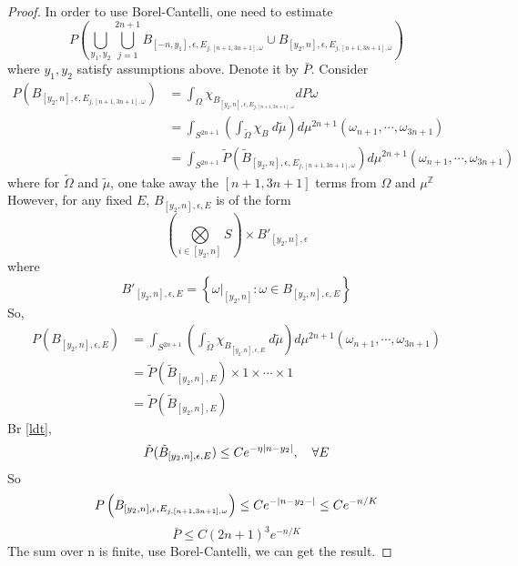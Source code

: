 \begin{proof}
In order to use Borel-Cantelli, one need to estimate
\[
  P\left(\bigcup\limits_{y_1,y_2}\bigcup\limits_{j=1}^{2n+1}
  B_{[-n,y_1],\epsilon,E_{j,[n+1,3n+1],\omega}}\cup B_{[y_2,n],\epsilon,E_{j,[n+1,3n+1],\omega}}\right)
\]
where $y_1,y_2$ satisfy assumptions above. Denote it by $\bar{P}$. Consider
\[
  \begin{aligned}
    P\left(B_{[y_2,n],\epsilon,E_{j,[n+1,3n+1],\omega}}\right)
    &= \int_\Omega \chi_{B_{[y_2,n],\epsilon,E_{j,[n+1,3n+1],\omega}}} dP\omega\\
    &= \int_{S^{2n+1}}\left(\int_{\tilde{\Omega}} \chi_{B}~ d\tilde{\mu}\right)d\mu^{2n+1}(\omega_{n+1},\cdots,\omega_{3n+1})\\
    &=\int_{S^{2n+1}} \tilde{P}(\tilde{B}_{[y_2,n],\epsilon,E_{j,[n+1,3n+1],\omega}})d\mu^{2n+1}(\omega_{n+1},\cdots,\omega_{3n+1})
  \end{aligned}
\]
where for $\tilde{\Omega}$ and $\tilde{\mu}$, one take away the $[n+1,3n+1]$ terms from $\Omega$ and $\mu^{\mathbb{Z}}$
However, for any fixed $E$, $B_{[y_2,n],\epsilon,E}$ is of the form
\[
  \left(\bigotimes\limits_{i\in[y_2,n]}S\right) \times {B'_{[y_2,n],\epsilon}}
\]
where
\[
  B'_{[y_2,n],\epsilon,E}=\left\{\omega|_{[y_2,n]}:\omega\in B_{[y_2,n],\epsilon,E}\right\}
\]
So,
\[
  \begin{aligned}
    P(B_{[y_2,n],\epsilon,E})
    &= \int_{S^{2n+1}}\left(\int_{\tilde{\Omega}} \chi_{B_{[y_2,n],\epsilon,E}}~ d\tilde{\mu}\right)d\mu^{2n+1}(\omega_{n+1},\cdots,\omega_{3n+1})\\
    &=\tilde{P}(\tilde{B}_{[y_2,n],E})\times 1\times\cdots\times 1\\
    &=\tilde{P}(\tilde{B}_{[y_2,n],E})
  \end{aligned}
\]
Br \eqref{ldt},
\[
\tilde{P}(\tilde{B}_{[y_2,n],\epsilon,E})\leq Ce^{-\eta\lvert n-y_2\rvert},\quad \forall E
\]
So
\[
P\left(B_{[y_2,n],\epsilon,E_{j,[n+1,3n+1],\omega}}\right)\leq Ce^{-\lvert n-y_2-\rvert}\leq Ce^{-n/K}
\]
\[
\bar{P}\leq C(2n+1)^3e^{-n/K}
\]
The sum over n is finite, use Borel-Cantelli, we can get the result.
\end{proof}
